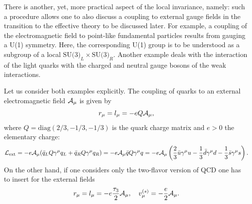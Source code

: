 \documentclass[twoside,12pt]{article}
\begin{document}
   There is another, yet, more practical aspect of the local invariance,
namely: such a procedure allows one to also discuss a coupling to external
gauge fields in the transition to the effective theory to be discussed later.
   For example, a coupling of the electromagnetic field to point-like
fundamental particles results from
gauging a U(1) symmetry.
  Here, the corresponding U(1) group is to be understood
as a subgroup of a local $\mbox{SU(3)}_L\times\mbox{SU(3)}_R$.
   Another example deals with the interaction of the light quarks
with the charged and neutral gauge bosons of the weak interactions.

   Let us consider both examples explicitly. The coupling of quarks
to an external electromagnetic field ${\cal A}_\mu$ is given by
\begin{equation}
\label{2:1:6:rla}
r_\mu=l_\mu=-e Q {\cal A}_\mu,
\end{equation}
where $Q=\mbox{diag}(2/3,-1/3,-1/3)$ is the quark charge matrix and $e>0$ the
elementary charge:
\begin{displaymath}
{\cal L}_{\rm ext}=-e {\cal A}_\mu(\bar{q}_L Q\gamma^\mu q_L
+\bar{q}_R Q \gamma^\mu q_R)
=-e {\cal A}_\mu \bar{q}Q\gamma^\mu q
=-e {\cal A}_\mu\left(\frac{2}{3}\bar{u}\gamma^\mu u
-\frac{1}{3} \bar{d}\gamma^\mu d -\frac{1}{3}\bar{s}\gamma^\mu s\right).
\end{displaymath}
   On the other hand, if one considers only the two-flavor version of QCD one
has to insert for the external fields
\begin{equation}
\label{2:1:6:rlasu2}
r_\mu=l_\mu=-e\frac{\tau_3}{2}{\cal A}_\mu,\quad
v_\mu^{(s)}=-\frac{e}{2}{\cal A}_\mu.
\end{equation}
\end{document}
